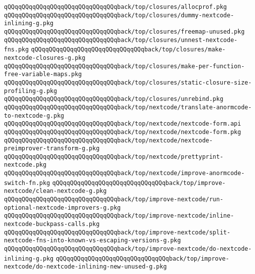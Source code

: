 \verb|qQQqqQQqqQQqqQQqqQQqqQQqqQQqqQQqback/top/closures/allocprof.pkg|\newline
\verb|qQQqqQQqqQQqqQQqqQQqqQQqqQQqqQQqback/top/closures/dummy-nextcode-inlining-g.pkg|\newline
\verb|qQQqqQQqqQQqqQQqqQQqqQQqqQQqqQQqback/top/closures/freemap-unused.pkg|\newline
\verb|qQQqqQQqqQQqqQQqqQQqqQQqqQQqqQQqback/top/closures/unnest-nextcode-fns.pkg|\newline
\verb|qQQqqQQqqQQqqQQqqQQqqQQqqQQqqQQqback/top/closures/make-nextcode-closures-g.pkg|\newline
\verb|qQQqqQQqqQQqqQQqqQQqqQQqqQQqqQQqback/top/closures/make-per-function-free-variable-maps.pkg|\newline
\verb|qQQqqQQqqQQqqQQqqQQqqQQqqQQqqQQqback/top/closures/static-closure-size-profiling-g.pkg|\newline
\verb|qQQqqQQqqQQqqQQqqQQqqQQqqQQqqQQqback/top/closures/unrebind.pkg|\newline
\verb|qQQqqQQqqQQqqQQqqQQqqQQqqQQqqQQqback/top/nextcode/translate-anormcode-to-nextcode-g.pkg|\newline
\verb|qQQqqQQqqQQqqQQqqQQqqQQqqQQqqQQqback/top/nextcode/nextcode-form.api|\newline
\verb|qQQqqQQqqQQqqQQqqQQqqQQqqQQqqQQqback/top/nextcode/nextcode-form.pkg|\newline
\verb|qQQqqQQqqQQqqQQqqQQqqQQqqQQqqQQqback/top/nextcode/nextcode-preimprover-transform-g.pkg|\newline
\verb|qQQqqQQqqQQqqQQqqQQqqQQqqQQqqQQqback/top/nextcode/prettyprint-nextcode.pkg|\newline
\verb|qQQqqQQqqQQqqQQqqQQqqQQqqQQqqQQqback/top/nextcode/improve-anormcode-switch-fn.pkg|\newline
\verb|qQQqqQQqqQQqqQQqqQQqqQQqqQQqqQQqback/top/improve-nextcode/clean-nextcode-g.pkg|\newline
\verb|qQQqqQQqqQQqqQQqqQQqqQQqqQQqqQQqback/top/improve-nextcode/run-optional-nextcode-improvers-g.pkg|\newline
\verb|qQQqqQQqqQQqqQQqqQQqqQQqqQQqqQQqback/top/improve-nextcode/inline-nextcode-buckpass-calls.pkg|\newline
\verb|qQQqqQQqqQQqqQQqqQQqqQQqqQQqqQQqback/top/improve-nextcode/split-nextcode-fns-into-known-vs-escaping-versions-g.pkg|\newline
\verb|qQQqqQQqqQQqqQQqqQQqqQQqqQQqqQQqback/top/improve-nextcode/do-nextcode-inlining-g.pkg|\newline
\verb|qQQqqQQqqQQqqQQqqQQqqQQqqQQqqQQqback/top/improve-nextcode/do-nextcode-inlining-new-unused-g.pkg|\newline
